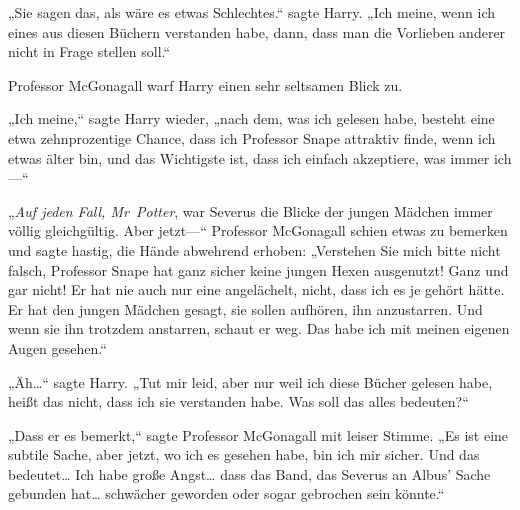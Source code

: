 „Sie sagen das, als wäre es etwas Schlechtes.“ sagte Harry. „Ich meine, wenn ich eines aus diesen Büchern verstanden habe, dann, dass man die Vorlieben anderer nicht in Frage stellen soll.“

Professor McGonagall warf Harry einen sehr seltsamen Blick zu.

„Ich meine,“ sagte Harry wieder, „nach dem, was ich gelesen habe, besteht eine etwa zehnprozentige Chance, dass ich Professor Snape attraktiv finde, wenn ich etwas älter bin, und das Wichtigste ist, dass ich einfach akzeptiere, was immer ich—“

„\emph{Auf jeden Fall, Mr~Potter}, war Severus die Blicke der jungen Mädchen immer völlig gleichgültig. Aber jetzt—“ Professor McGonagall schien etwas zu bemerken und sagte hastig, die Hände abwehrend erhoben: „Verstehen Sie mich bitte nicht falsch, Professor Snape hat ganz sicher keine jungen Hexen ausgenutzt! Ganz und gar nicht! Er hat nie auch nur eine angelächelt, nicht, dass ich es je gehört hätte. Er hat den jungen Mädchen gesagt, sie sollen aufhören, ihn anzustarren. Und wenn sie ihn trotzdem anstarren, schaut er weg. Das habe ich mit meinen eigenen Augen gesehen.“

„Äh…“ sagte Harry. „Tut mir leid, aber nur weil ich diese Bücher gelesen habe, heißt das nicht, dass ich sie verstanden habe. Was soll das alles bedeuten?“

„Dass er es bemerkt,“ sagte Professor McGonagall mit leiser Stimme. „Es ist eine subtile Sache, aber jetzt, wo ich es gesehen habe, bin ich mir sicher. Und das bedeutet… Ich habe große Angst… dass das Band, das Severus an Albus' Sache gebunden hat… schwächer geworden oder sogar gebrochen sein könnte.“

